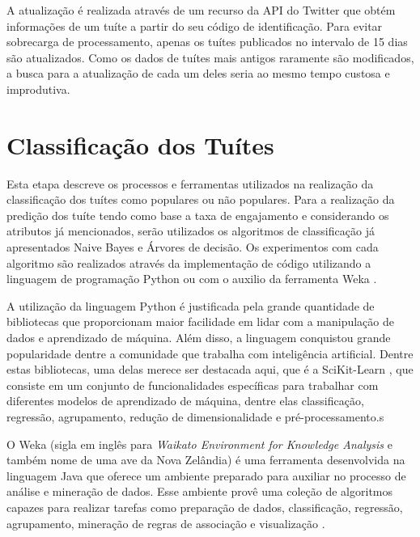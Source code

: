 \documentclass[oneside,openright,12pt]{ufsm_2015} %
\begin{document}
    \par A atualização é realizada através de um recurso da API do Twitter que obtém informações de um tuíte a partir do seu código de identificação. Para evitar sobrecarga de processamento, apenas os tuítes publicados no intervalo de 15 dias são atualizados. Como os dados de tuítes mais antigos raramente são modificados, a busca para a atualização de cada um deles seria ao mesmo tempo custosa e improdutiva.


\section{Classificação dos Tuítes}

    \par Esta etapa descreve os processos e ferramentas utilizados na realização da classificação dos tuítes como populares ou não populares. Para a realização da predição dos tuíte tendo como base a taxa de engajamento e considerando os atributos já mencionados, serão utilizados os algoritmos de classificação já apresentados Naive Bayes e Árvores de decisão. Os experimentos com cada algoritmo são realizados através da implementação de código utilizando a linguagem de programação Python \cite{site:python} ou com o auxilio da ferramenta Weka \cite{site:weka}.
    
    \par A utilização da linguagem Python é justificada pela grande quantidade de bibliotecas que proporcionam maior facilidade em lidar com a manipulação de dados e aprendizado de máquina. Além disso, a linguagem conquistou grande popularidade dentre a comunidade que trabalha com inteligência artificial. Dentre estas bibliotecas, uma delas merece ser destacada aqui, que é a SciKit-Learn \cite{site:scikit-learn}, que consiste em um conjunto de funcionalidades específicas para trabalhar com diferentes modelos de aprendizado de máquina, dentre elas classificação, regressão, agrupamento, redução de dimensionalidade e pré-processamento.s
    
    \par O Weka (sigla em inglês para \textit{Waikato Environment for Knowledge Analysis} e também nome de uma ave da Nova Zelândia) é uma ferramenta desenvolvida na linguagem Java que oferece um ambiente preparado para auxiliar no processo de análise e mineração de dados. Esse ambiente provê uma coleção de algoritmos capazes para realizar tarefas como preparação de dados, classificação, regressão, agrupamento, mineração de regras de associação e visualização \cite{site:weka}.
\end{document}
